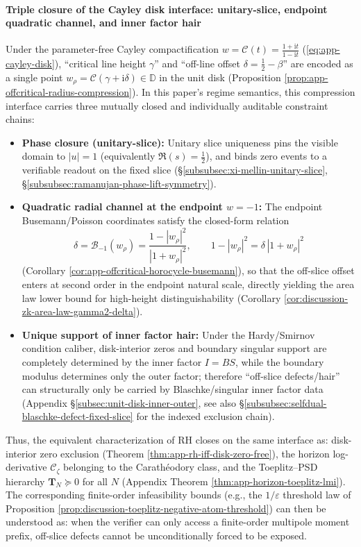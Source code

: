 \paragraph{Triple closure of the Cayley disk interface: unitary-slice, endpoint quadratic channel, and inner factor hair}
Under the parameter-free Cayley compactification \(w=\mathcal{C}(t)=\frac{1+\mathrm{i}t}{1-\mathrm{i}t}\) (\eqref{eq:app-cayley-disk}), ``critical line height \(\gamma\)'' and ``off-line offset \(\delta=\tfrac12-\beta\)'' are encoded as a single point
\(
w_\rho=\mathcal{C}(\gamma+\mathrm{i}\delta)\in\mathbb{D}
\)
in the unit disk (Proposition \ref{prop:app-offcritical-radius-compression}).
In this paper's regime semantics, this compression interface carries three mutually closed and individually auditable constraint chains:
\begin{itemize}
  \item \textbf{Phase closure (unitary-slice):} Unitary slice uniqueness pins the visible domain to \(|u|=1\) (equivalently \(\Re(s)=\tfrac12\)), and binds zero events to a verifiable readout on the fixed slice (\S\ref{subsubsec:xi-mellin-unitary-slice}, \S\ref{subsubsec:ramanujan-phase-lift-symmetry}).
  \item \textbf{Quadratic radial channel at the endpoint \texorpdfstring{$w=-1$}{w=-1}:} The endpoint Busemann/Poisson coordinates satisfy the closed-form relation
  \[
  \delta=\mathcal{B}_{-1}(w_\rho)=\frac{1-|w_\rho|^2}{|1+w_\rho|^2},
  \qquad
  1-|w_\rho|^2=\delta\,|1+w_\rho|^2
  \]
  (Corollary \ref{cor:app-offcritical-horocycle-busemann}), so that the off-slice offset enters at second order in the endpoint natural scale, directly yielding the area law lower bound for high-height distinguishability (Corollary \ref{cor:discussion-zk-area-law-gamma2-delta}).
  \item \textbf{Unique support of inner factor hair:} Under the Hardy/Smirnov condition caliber, disk-interior zeros and boundary singular support are completely determined by the inner factor \(I=BS\), while the boundary modulus determines only the outer factor; therefore ``off-slice defects/hair'' can structurally only be carried by Blaschke/singular inner factor data (Appendix \S\ref{subsec:unit-disk-inner-outer}, see also \S\ref{subsubsec:selfdual-blaschke-defect-fixed-slice} for the indexed exclusion chain).
\end{itemize}
Thus, the equivalent characterization of RH closes on the same interface as: disk-interior zero exclusion (Theorem \ref{thm:app-rh-iff-disk-zero-free}), the horizon log-derivative \(\mathscr{C}_\zeta\) belonging to the Carath\'eodory class, and the Toeplitz--PSD hierarchy \(\mathbf{T}_N\succeq 0\) for all \(N\) (Appendix Theorem \ref{thm:app-horizon-toeplitz-lmi}).
The corresponding finite-order infeasibility bounds (e.g., the \(1/\varepsilon\) threshold law of Proposition \ref{prop:discussion-toeplitz-negative-atom-threshold}) can then be understood as: when the verifier can only access a finite-order multipole moment prefix, off-slice defects cannot be unconditionally forced to be exposed.

